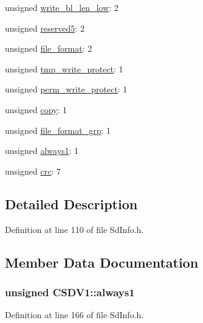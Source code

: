 \begin{DoxyCompactItemize}
\item 
unsigned \hyperlink{struct_c_s_d_v1_a57c6fb1515a4377af6c642c5d66f7a35}{write\+\_\+bl\+\_\+len\+\_\+low}\+: 2
\item 
unsigned \hyperlink{struct_c_s_d_v1_ab19ce641d4e1ed12241f3519836c30dc}{reserved5}\+: 2
\item 
unsigned \hyperlink{struct_c_s_d_v1_a537754d4987f7c51d5a67b66d8870cf5}{file\+\_\+format}\+: 2
\item 
unsigned \hyperlink{struct_c_s_d_v1_a79be71efc43a4706a1f1fd6023f574db}{tmp\+\_\+write\+\_\+protect}\+: 1
\item 
unsigned \hyperlink{struct_c_s_d_v1_a56bd241d539d5a48b97a64587908e55d}{perm\+\_\+write\+\_\+protect}\+: 1
\item 
unsigned \hyperlink{struct_c_s_d_v1_a59b32955a2955914ad68a5207da3634e}{copy}\+: 1
\item 
unsigned \hyperlink{struct_c_s_d_v1_a39a7305faa36816b35635cbc6a6810dd}{file\+\_\+format\+\_\+grp}\+: 1
\item 
unsigned \hyperlink{struct_c_s_d_v1_a5d5093fb1a3d7414f1f26158cc522339}{always1}\+: 1
\item 
unsigned \hyperlink{struct_c_s_d_v1_a2d5f23ba505a0a139bdc685bd50c2ef1}{crc}\+: 7
\end{DoxyCompactItemize}


\subsection{Detailed Description}


Definition at line 110 of file Sd\+Info.\+h.



\subsection{Member Data Documentation}
\subsubsection[{\texorpdfstring{always1}{always1}}]{\setlength{\rightskip}{0pt plus 5cm}unsigned C\+S\+D\+V1\+::always1}\hypertarget{struct_c_s_d_v1_a5d5093fb1a3d7414f1f26158cc522339}{}\label{struct_c_s_d_v1_a5d5093fb1a3d7414f1f26158cc522339}


Definition at line 166 of file Sd\+Info.\+h.

